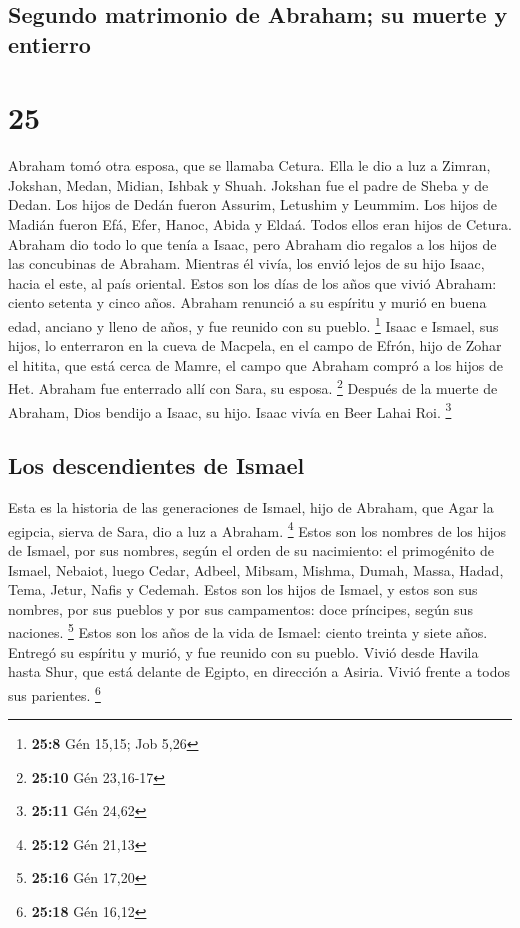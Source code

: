 \hypertarget{segundo-matrimonio-de-abraham-su-muerte-y-entierro}{%
\subsection{Segundo matrimonio de Abraham; su muerte y
entierro}\label{segundo-matrimonio-de-abraham-su-muerte-y-entierro}}

\hypertarget{section-24}{%
\section{25}\label{section-24}}

 Abraham tomó otra esposa, que se llamaba Cetura.
 Ella le dio a luz a Zimran, Jokshan, Medan, Midian,
Ishbak y Shuah.  Jokshan fue el padre de Sheba y de Dedan.
Los hijos de Dedán fueron Assurim, Letushim y Leummim. 
Los hijos de Madián fueron Efá, Efer, Hanoc, Abida y Eldaá. Todos ellos
eran hijos de Cetura.  Abraham dio todo lo que tenía a
Isaac,  pero Abraham dio regalos a los hijos de las
concubinas de Abraham. Mientras él vivía, los envió lejos de su hijo
Isaac, hacia el este, al país oriental.  Estos son los
días de los años que vivió Abraham: ciento setenta y cinco años.
 Abraham renunció a su espíritu y murió en buena edad,
anciano y lleno de años, y fue reunido con su pueblo. \footnote{\textbf{25:8}
  Gén 15,15; Job 5,26}  Isaac e Ismael, sus hijos, lo
enterraron en la cueva de Macpela, en el campo de Efrón, hijo de Zohar
el hitita, que está cerca de Mamre,  el campo que Abraham
compró a los hijos de Het. Abraham fue enterrado allí con Sara, su
esposa. \footnote{\textbf{25:10} Gén 23,16-17}  Después
de la muerte de Abraham, Dios bendijo a Isaac, su hijo. Isaac vivía en
Beer Lahai Roi. \footnote{\textbf{25:11} Gén 24,62}

\hypertarget{los-descendientes-de-ismael}{%
\subsection{Los descendientes de
Ismael}\label{los-descendientes-de-ismael}}

 Esta es la historia de las generaciones de Ismael, hijo
de Abraham, que Agar la egipcia, sierva de Sara, dio a luz a Abraham.
\footnote{\textbf{25:12} Gén 21,13}  Estos son los
nombres de los hijos de Ismael, por sus nombres, según el orden de su
nacimiento: el primogénito de Ismael, Nebaiot, luego Cedar, Adbeel,
Mibsam,  Mishma, Dumah, Massa,  Hadad,
Tema, Jetur, Nafis y Cedemah.  Estos son los hijos de
Ismael, y estos son sus nombres, por sus pueblos y por sus campamentos:
doce príncipes, según sus naciones. \footnote{\textbf{25:16} Gén 17,20}
 Estos son los años de la vida de Ismael: ciento treinta
y siete años. Entregó su espíritu y murió, y fue reunido con su pueblo.
 Vivió desde Havila hasta Shur, que está delante de
Egipto, en dirección a Asiria. Vivió frente a todos sus parientes.
\footnote{\textbf{25:18} Gén 16,12}

